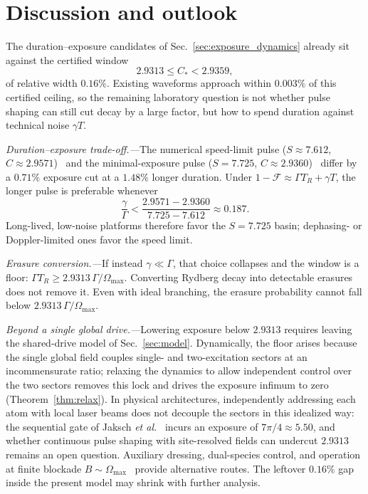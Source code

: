 \documentclass[aps,prx,reprint,nofootinbib,longbibliography,floatfix]{revtex4-2}
\theoremstyle{plain}
\theoremstyle{remark}
\newcommand{\Omax}{\Omega_{\max}}
\newcommand{\TR}{T_{R}}
\begin{document}
\section{Discussion and outlook}
\label{sec:discussion}

The duration--exposure candidates of Sec.~\ref{sec:exposure_dynamics} already sit against the certified window
\begin{equation}
2.9313 \le C_* < 2.9359,
\label{eq:certified_window_disc}
\end{equation}
of relative width $0.16\%$. Existing waveforms approach within $0.003\%$ of this certified ceiling, so the remaining laboratory question is not whether pulse shaping can still cut decay by a large factor, but how to spend duration against technical noise $\gamma T$.

\textit{Duration--exposure trade-off.---}The numerical speed-limit pulse ($S\approx7.612$, $C\approx2.9571$)~\cite{JP22} and the minimal-exposure pulse ($S=7.725$, $C\approx2.9360$)~\cite{Locher25} differ by a $0.71\%$ exposure cut at a $1.48\%$ longer duration. Under $1-\mathcal F\approx\Gamma\TR+\gamma T$, the longer pulse is preferable whenever
\begin{equation}
\frac{\gamma}{\Gamma} < \frac{2.9571 - 2.9360}{7.725 - 7.612} \approx 0.187.
\end{equation}
Long-lived, low-noise platforms therefore favor the $S=7.725$ basin; dephasing- or Doppler-limited ones favor the speed limit.

\textit{Erasure conversion.---}If instead $\gamma\ll\Gamma$, that choice collapses and the window is a floor: $\Gamma\TR\ge2.9313\,\Gamma/\Omax$. Converting Rydberg decay into detectable erasures~\cite{Wu22,Scholl23,Ma23} does not remove it. Even with ideal branching, the erasure probability cannot fall below $2.9313\,\Gamma/\Omax$.

\textit{Beyond a single global drive.---}Lowering exposure below $2.9313$ requires leaving the shared-drive model of Sec.~\ref{sec:model}. Dynamically, the floor arises because the single global field couples single- and two-excitation sectors at an incommensurate ratio; relaxing the dynamics to allow independent control over the two sectors removes this lock and drives the exposure infimum to zero (Theorem~\ref{thm:relax}). In physical architectures, independently addressing each atom with local laser beams does not decouple the sectors in this idealized way: the sequential gate of Jaksch \emph{et al.}~\cite{Jaksch00} incurs an exposure of $7\pi/4\approx5.50$, and whether continuous pulse shaping with site-resolved fields can undercut $2.9313$ remains an open question. Auxiliary dressing, dual-species control, and operation at finite blockade $B\sim\Omax$~\cite{DDP25} provide alternative routes. The leftover $0.16\%$ gap inside the present model may shrink with further analysis.
\end{document}
